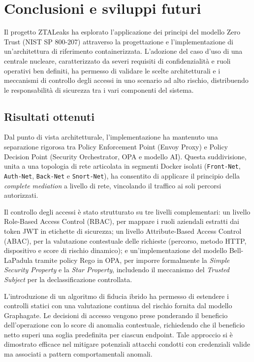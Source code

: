 \chapter{Conclusioni e sviluppi futuri}

Il progetto ZTALeaks ha esplorato l'applicazione dei principi del modello Zero Trust (NIST SP 800-207) attraverso la progettazione e l'implementazione di un'architettura di riferimento containerizzata. L'adozione del caso d'uso di una centrale nucleare, caratterizzato da severi requisiti di confidenzialità e ruoli operativi ben definiti, ha permesso di validare le scelte architetturali e i meccanismi di controllo degli accessi in uno scenario ad alto rischio, distribuendo le responsabilità di sicurezza tra i vari componenti del sistema.

\section{Risultati ottenuti}

Dal punto di vista architetturale, l'implementazione ha mantenuto una separazione rigorosa tra Policy Enforcement Point (Envoy Proxy) e Policy Decision Point (Security Orchestrator, OPA e modello AI). Questa suddivisione, unita a una topologia di rete articolata in segmenti Docker isolati (\texttt{Front-Net}, \texttt{Auth-Net}, \texttt{Back-Net} e \texttt{Snort-Net}), ha consentito di applicare il principio della \textit{complete mediation} a livello di rete, vincolando il traffico ai soli percorsi autorizzati.

Il controllo degli accessi è stato strutturato su tre livelli complementari: un livello Role-Based Access Control (RBAC), per mappare i ruoli aziendali estratti dai token JWT in etichette di sicurezza; un livello Attribute-Based Access Control (ABAC), per la valutazione contestuale delle richieste (percorso, metodo HTTP, dispositivo e score di rischio dinamico); e un'implementazione del modello Bell-LaPadula tramite policy Rego in OPA, per imporre formalmente la \textit{Simple Security Property} e la \textit{Star Property}, includendo il meccanismo del \textit{Trusted Subject} per la declassificazione controllata.

L'introduzione di un algoritmo di fiducia ibrido ha permesso di estendere i controlli statici con una valutazione continua del rischio fornita dal modello Graphagate. Le decisioni di accesso vengono prese ponderando il beneficio dell'operazione con lo score di anomalia contestuale, richiedendo che il beneficio netto superi una soglia predefinita per ciascun endpoint. Tale approccio si è dimostrato efficace nel mitigare potenziali attacchi condotti con credenziali valide ma associati a pattern comportamentali anomali.


